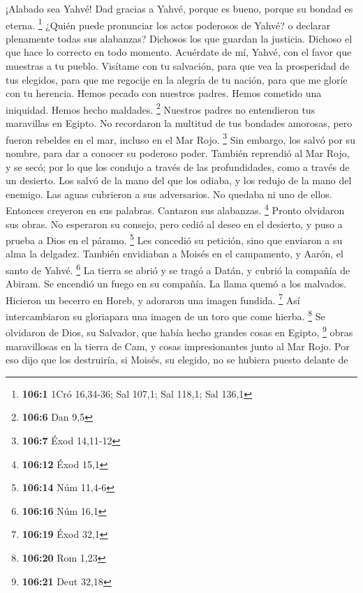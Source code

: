 \begin{paracol}{2}
 ¡Alabado sea Yahvé! Dad gracias a Yahvé, porque es bueno,
porque su bondad es eterna. \footnote{\textbf{106:1} 1Cró 16,34-36; Sal
  107,1; Sal 118,1; Sal 136,1}  ¿Quién puede pronunciar
los actos poderosos de Yahvé? o declarar plenamente todas sus alabanzas?
 Dichosos los que guardan la justicia. Dichoso el que hace
lo correcto en todo momento.  Acuérdate de mí, Yahvé, con
el favor que muestras a tu pueblo. Visítame con tu salvación,
 para que vea la prosperidad de tus elegidos, para que me
regocije en la alegría de tu nación, para que me gloríe con tu herencia.
 Hemos pecado con nuestros padres. Hemos cometido una
iniquidad. Hemos hecho maldades. \footnote{\textbf{106:6} Dan 9,5}
 Nuestros padres no entendieron tus maravillas en Egipto.
No recordaron la multitud de tus bondades amorosas, pero fueron rebeldes
en el mar, incluso en el Mar Rojo. \footnote{\textbf{106:7} Éxod
  14,11-12}  Sin embargo, los salvó por su nombre, para
dar a conocer su poderoso poder.  También reprendió al Mar
Rojo, y se secó; por lo que los condujo a través de las profundidades,
como a través de un desierto.  Los salvó de la mano del
que los odiaba, y los redujo de la mano del enemigo.  Las
aguas cubrieron a sus adversarios. No quedaba ni uno de ellos.
 Entonces creyeron en sus palabras. Cantaron sus
alabanzas. \footnote{\textbf{106:12} Éxod 15,1}  Pronto
olvidaron sus obras. No esperaron su consejo,  pero cedió
al deseo en el desierto, y puso a prueba a Dios en el páramo.
\footnote{\textbf{106:14} Núm 11,4-6}  Les concedió su
petición, sino que enviaron a su alma la delgadez. 
También envidiaban a Moisés en el campamento, y Aarón, el santo de
Yahvé. \footnote{\textbf{106:16} Núm 16,1}  La tierra se
abrió y se tragó a Datán, y cubrió la compañía de Abiram.
 Se encendió un fuego en su compañía. La llama quemó a
los malvados.  Hicieron un becerro en Horeb, y adoraron
una imagen fundida. \footnote{\textbf{106:19} Éxod 32,1} 
Así intercambiaron su gloriapara una imagen de un toro que come hierba.
\footnote{\textbf{106:20} Rom 1,23}  Se olvidaron de
Dios, su Salvador, que había hecho grandes cosas en Egipto, \footnote{\textbf{106:21}
  Deut 32,18}  obras maravillosas en la tierra de Cam, y
cosas impresionantes junto al Mar Rojo.  Por eso dijo que
los destruiría, si Moisés, su elegido, no se hubiera puesto delante de

\end{paracol}
